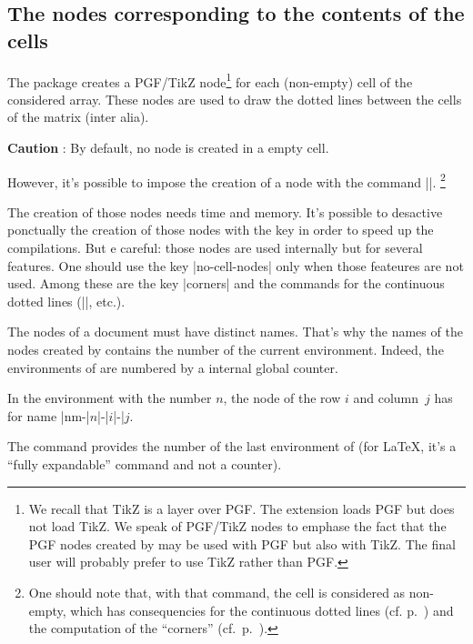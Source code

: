 \documentclass[dvipsnames]{article}%
\begin{document}
\label{name}
\label{PGF-nodes}

\subsection{The nodes corresponding to the contents of the cells}


The package  creates a PGF/TikZ node\footnote{We recall that TikZ
is a layer over PGF. The extension  loads PGF but does not
load TikZ. We speak of PGF/TikZ nodes to emphase the fact that the PGF nodes
created by  may be used with PGF but also with TikZ. The final
user will probably prefer to use TikZ rather than PGF.} for each (non-empty) cell
of the considered array. These nodes are used to draw the dotted lines between
the cells of the matrix (inter alia).


\smallskip
\textbf{Caution} : By default, no node is created in a empty cell.

\smallskip
However, it's possible to impose the creation of a node with the command
|\NotEmpty|. \footnote{One should note that, with that command, the cell is
considered as non-empty, which has consequencies for the continuous dotted
lines (cf. p.~\pageref{Cdots}) and the computation of the ``corners''
(cf.~p.~\pageref{corners}).}

\medskip
The creation of those nodes needs time and memory. It's possible to desactive
ponctually the creation of those nodes with the key 
in order to speed up the compilations. But e careful: those nodes are used
internally but  for several features. One should use the key
|no-cell-nodes| only when those feateures are not used. Among these are the key
|corners| and the commands for the continuous dotted lines (|\Cdots|, etc.).

\medskip
The nodes of a document must have distinct names. That's why the names of the
nodes created by  contains the number of the current
environment. Indeed, the environments of  are numbered by a
internal global counter. 

\smallskip
In the environment with the number $n$, the node of the row $i$ and
column~$j$ has for name |nm-|$n$|-|$i$|-|$j$. 

\smallskip
The command  provides the number of the
last environment of  (for LaTeX, it's a ``fully expandable''
command and not a counter).
\end{document}
